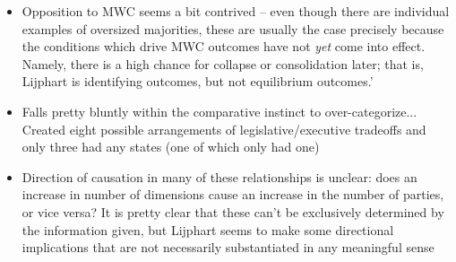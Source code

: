 \documentclass[12pt]{article}
\begin{document}
\begin{itemize}
    \item Opposition to MWC seems a bit contrived -- even though there are individual examples of oversized majorities, these are usually the case precisely because the conditions which drive MWC outcomes have not \emph{yet} come into effect. Namely, there is a high chance for collapse or consolidation later; that is, Lijphart is identifying outcomes, but not equilibrium outcomes.'
    \item Falls pretty bluntly within the comparative instinct to over-categorize... Created eight possible arrangements of legislative/executive tradeoffs and only three had any states (one of which only had one)
    \item Direction of causation in many of these relationships is unclear: does an increase in number of dimensions cause an increase in the number of parties, or vice versa? It is pretty clear that these can't be exclusively determined by the information given, but Lijphart seems to make some directional implications that are not necessarily substantiated in any meaningful sense
\end{itemize}
\end{document}
